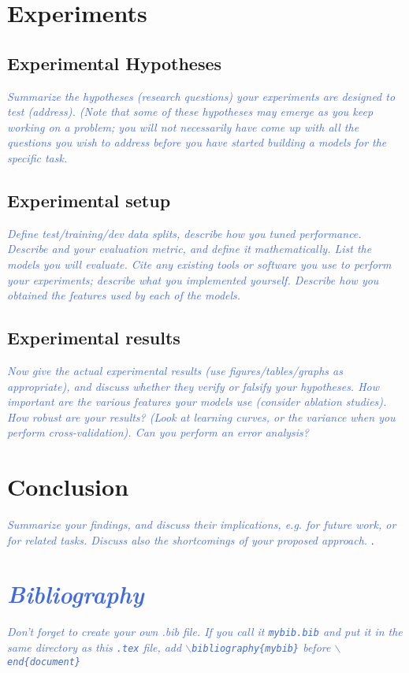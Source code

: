 \documentclass[11pt,letterpaper]{article}
\newcommand{\blue}[1]{\textcolor{RoyalBlue}{#1}}
\newcommand{\instructions}[1]{\blue{\textit{#1}}}
\begin{document}
\section{Experiments}
\label{sec:experiments}

\subsection{Experimental Hypotheses}
\label{sec:exper-hypoth}
\instructions{Summarize the hypotheses (research questions) your experiments are designed to test (address). (Note that some of these hypotheses may emerge as you keep working on a problem; you will not necessarily have come up with all the questions you wish to address before you have started building a models for the specific task.}

\subsection{Experimental setup}
\label{sec:experimental-setup}
\instructions{Define test/training/dev data splits, describe how you tuned performance. Describe and your evaluation metric, and define it mathematically.
List the models you will evaluate. Cite any existing tools or software you use to perform your experiments; describe what you implemented yourself. Describe how you obtained the features used by each of the models.}

\subsection{Experimental results}
\label{sec:experimental-results}
\instructions{Now give the actual experimental results (use figures/tables/graphs as appropriate), and discuss whether they verify or falsify your hypotheses. How important are the various features your models use (consider ablation studies). How robust are your results? (Look at learning curves, or the variance when you perform cross-validation). Can you perform an error analysis?}

\section{Conclusion}
\instructions{Summarize your findings, and discuss their implications, e.g. for future work, or for related tasks. Discuss also the shortcomings of your proposed approach. }. 

\section*{\instructions{Bibliography}}
\instructions{Don't forget to create your own .bib file. If you call it {\tt mybib.bib} and put it in the same directory as this {\tt .tex} file, add {\tt$\backslash$bibliography\{mybib\}} before {\tt$\backslash$end\{document\}}
}
  
%
\end{document}

